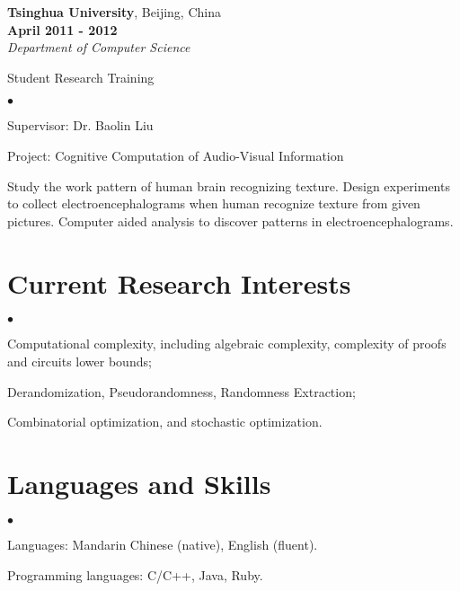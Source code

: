 \documentclass[margin,line]{res}
\newenvironment{list1}{
  \begin{list}{\ding{113}}{%
      \setlength{\itemsep}{0in}
      \setlength{\parsep}{0in} \setlength{\parskip}{0in}
      \setlength{\topsep}{0in} \setlength{\partopsep}{0in}
      \setlength{\leftmargin}{0.17in}}}{\end{list}}
\newenvironment{list2}{
  \begin{list}{$\bullet$}{%
      \setlength{\itemsep}{0in}
      \setlength{\parsep}{0in} \setlength{\parskip}{0in}
      \setlength{\topsep}{0in} \setlength{\partopsep}{0in}
      \setlength{\leftmargin}{0.2in}}}{\end{list}}
\begin{document}
\begin{resume}
{\bf Tsinghua University}, Beijing, China \\
\vspace*{-.1in}
\hspace*{\fill} {\bf April 2011 - 2012}\\
{\em Department of Computer Science}\\
\vspace*{-.1in}
\begin{list1}
\item[] Student Research Training
\begin{list2}
\vspace*{.05in}
\item Supervisor: Dr. Baolin Liu
\item Project:  Cognitive Computation of Audio-Visual Information
\item Study the work pattern of human brain recognizing  texture. Design experiments to collect electroencephalograms when human recognize texture from given pictures. Computer aided analysis to discover patterns in electroencephalograms.
\end{list2}
\vspace*{.05in}
\end{list1}



\section{\sc Current Research Interests }
\begin{list2}
	\item Computational complexity, including algebraic complexity, complexity of proofs and circuits lower bounds;
	\item  Derandomization, Pseudorandomness, Randomness Extraction;
	\item Combinatorial optimization, and stochastic optimization.
\end{list2}
%

\section{\sc Languages and Skills}
\begin{list2}
	\item Languages:  Mandarin Chinese (native), English (fluent).
	\item Programming languages:  C/C++, Java, Ruby.
\end{list2}



\end{resume}
\end{document}
